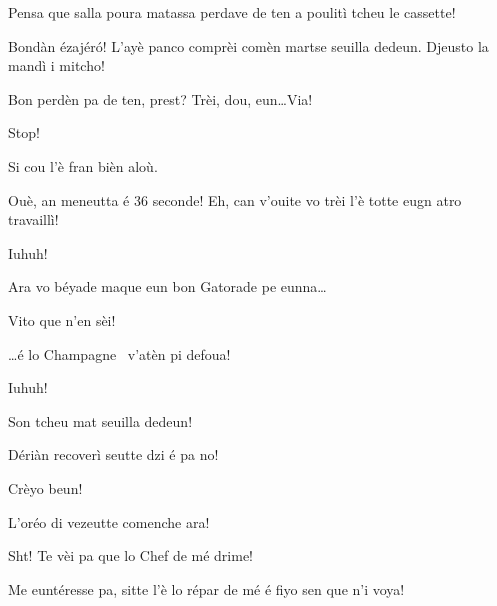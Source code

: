 \begin{drama}
\FennepulisieCspeaks Pensa que salla poura matassa perdave de ten a poulitì tcheu le cassette!

\FennepulisieAspeaks Bondàn ézajér\'o! L’ayè panco comprèi comèn mar\-tse seuilla dedeun. Djeusto la mandì i mitcho!

\Starterspeaks Bon perdèn pa de ten, prest? Trèi, dou, eun\ldots Via!




\Starterspeaks Stop!

\FennepulisieBspeaks Si cou l’è fran bièn aloù.

\Starterspeaks Ouè, an meneutta é 36 seconde! Eh, can v'ouite vo trèi l’è totte eugn atro travaillì! 

\Fennepulisiespeaks Iuhuh!

\Starterspeaks Ara vo béyade maque eun bon Gatorade pe eunna\ldots

\FennepulisieCspeaks Vito que n'en sèi!


\Starterspeaks \ldots é lo Champagne \champagne\ v'atèn pi defoua!

\Fennepulisiespeaks Iuhuh!


\Gerominespeaks Son tcheu mat seuilla dedeun!

\Casimirspeaks Dériàn recoverì seutte dzi é pa no!

\Gerominespeaks Crèyo beun!



\Eunfeurmiespeaks {} L'oréo di vezeutte comen\-che ara!

\Eunfeurmispeaks Sht! Te vèi pa que lo Chef de mé drime!

\Eunfeurmiespeaks {} Me euntéresse pa, sitte l'è lo répar de mé é fiyo sen que n’i voya!


\end{drama}
